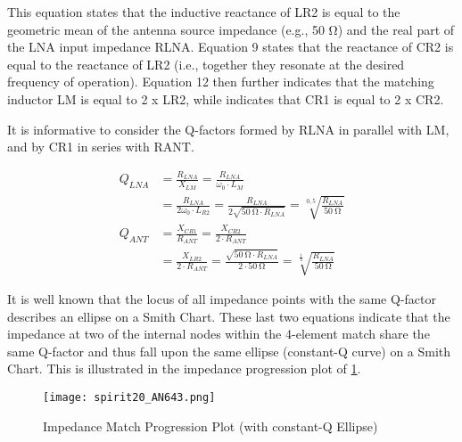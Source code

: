         This equation states that the inductive reactance of LR2 is equal to the geometric mean of 
        the antenna source impedance (e.g., 50 Ω) and the real part of the LNA input impedance 
        RLNA. Equation 9 states that the reactance of CR2 is equal to the reactance of LR2 (i.e., 
        together they resonate at the desired frequency of operation). Equation 12 then further 
        indicates that the matching inductor LM is equal to 2 x LR2, while indicates that CR1 is 
        equal to 2 x CR2.
        
        It is informative to consider the Q-factors formed by RLNA in parallel with LM, and by CR1 
        in series with RANT.
        
        \begin{align}
          Q_{LNA} &= \frac{R_{LNA}}{X_{LM}} 
                   = \frac{R_{LNA}}{\omega_0\cdot L_{M}}    \nonumber \\
                  &= \frac{R_{LNA}}{2\omega_0\cdot L_{R2}} 
                   = \frac{R_{LNA}}{2\sqrt{\qty{50}{\ohm}\cdot R_{LNA}}}
                   = \sqrt[0,5]{\frac{R_{LNA}}{\qty{50}{\ohm}}}        \label{EXP001:eq_spirit27} \\ 
          Q_{ANT} &= \frac{X_{CR1}}{R_{ANT}} 
                   = \frac{X_{CR2}}{2\cdot R_{ANT}}         \nonumber \\
                  &= \frac{X_{LR2}}{2\cdot R_{ANT}} 
                   = \frac{\sqrt{\qty{50}{\ohm}\cdot R_{LNA}}}{2\cdot \qty{50}{\ohm}}
                   = \sqrt[\frac{1}{2}]{\frac{R_{LNA}}{\qty{50}{\ohm}}}  \label{EXP001:eq_spirit28}  
        \end{align}
        
        It is well known that the locus of all impedance points with the same Q-factor describes an 
        ellipse on a Smith Chart. These last two equations indicate that the impedance at two of 
        the internal nodes within the 4-element match share the same Q-factor and thus fall upon 
        the same ellipse (constant-Q curve) on a Smith Chart. This is illustrated in the impedance 
        progression plot of 
        \ref{EXP001:fig_spirit20}.
        
        \begin{figure}[ht!] %
          \centering
          \texttt{[image: spirit20\_AN643.png]}
          \caption{Impedance Match Progression Plot (with constant-Q Ellipse) \cite[s.~18]{AN643SiliconLabs}}
          \label{EXP001:fig_spirit20}
        \end{figure}
        
